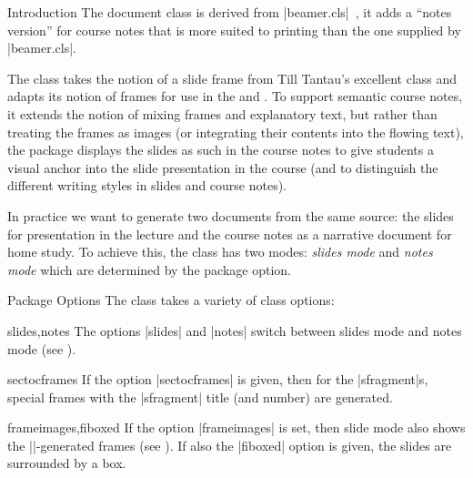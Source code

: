 \begin{sfragment}{Introduction}
  The  document class is derived from |beamer.cls|~\cite{beamerclass:on},
it adds a ``notes version'' for course notes that is more suited to printing than the one
supplied by |beamer.cls|.

The  class takes the notion of a slide frame from Till Tantau's excellent
 class and adapts its notion of frames for use in the \sTeX and \omdoc. To
support semantic course notes, it extends the notion of mixing frames and explanatory
text, but rather than treating the frames as images (or integrating their contents into
the flowing text), the  package displays the slides as such in the course
notes to give students a visual anchor into the slide presentation in the course (and to
distinguish the different writing styles in slides and course notes).

In practice we want to generate two documents from the same source: the slides for
presentation in the lecture and the course notes as a narrative document for home
study. To achieve this, the  class has two modes: \emph{slides mode} and
\emph{notes mode} which are determined by the package option. 
\end{sfragment}

\begin{sfragment}{Package Options}
  The  class takes a variety of class options:

  \begin{variable}{slides,notes} The options |slides| and |notes| switch between slides
    mode and notes mode (see ).
  \end{variable}

  \begin{variable}{sectocframes} If the option |sectocframes| is given, then for the
    |sfragment|s, special frames with the |sfragment| title (and number) are generated.
  \end{variable}

  \begin{variable}{frameimages,fiboxed}
    If the option |frameimages| is set, then slide mode also shows the
    |\frameimage|-generated frames (see ). If also the |fiboxed|
    option is given, the slides are surrounded by a box.
  \end{variable}
\end{sfragment}

